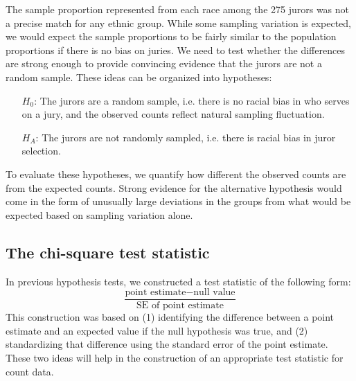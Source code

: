 The sample proportion represented from each race among the 275 jurors was not a precise match for any ethnic group. While some sampling variation is expected, we would expect the sample proportions to be fairly similar to the population proportions if there is no bias on juries. We need to test whether the differences are strong enough to provide convincing evidence that the jurors are not a random sample. These ideas can be organized into hypotheses:
\begin{itemize}
\setlength{\itemsep}{0mm}
\item[$H_0$:] The jurors are a random sample, i.e. there is no racial bias in who serves on a jury, and the observed counts reflect natural sampling fluctuation.
\item[$H_A$:] The jurors are not randomly sampled, i.e. there is racial bias in juror selection.
\end{itemize}
To evaluate these hypotheses, we quantify how different the observed counts are from the expected counts. Strong evidence for the alternative hypothesis would come in the form of unusually large deviations in the groups from what would be expected based on sampling variation alone.


\subsection{The chi-square test statistic}
\label{chiSquareTestStatistic}

In previous hypothesis tests, we constructed a test statistic of the following form:
$$ \frac{\text{point estimate} - \text{null value}}{\text{SE of point estimate}} $$
This construction was based on (1) identifying the difference between a point estimate and an expected value if the null hypothesis was true, and (2) standardizing that difference using the standard error of the point estimate. These two ideas will help in the construction of an appropriate test statistic for count data.

